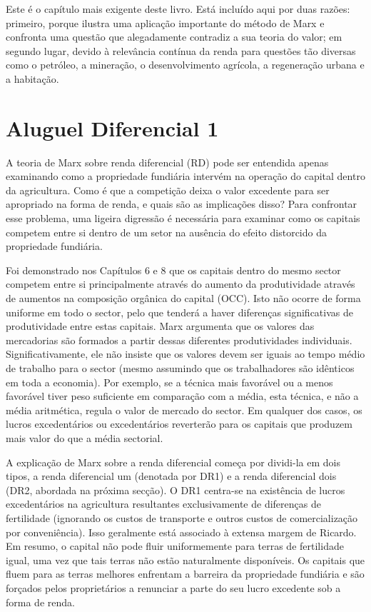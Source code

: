 \par 
Este é o capítulo mais exigente deste livro. Está incluído aqui por duas razões: primeiro, porque ilustra uma aplicação importante do método de Marx e confronta uma questão que alegadamente contradiz a sua teoria do valor; em segundo lugar, devido à relevância contínua da renda para questões tão diversas como o petróleo, a mineração, o desenvolvimento agrícola, a regeneração urbana e a habitação.
 \par 
\section{Aluguel Diferencial 1}
 \par 
A teoria de Marx sobre renda diferencial (RD) pode ser entendida apenas examinando como a propriedade fundiária intervém na operação do capital dentro da agricultura. Como é que a competição deixa o valor excedente para ser apropriado na forma de renda, e quais são as implicações disso? Para confrontar esse problema, uma ligeira digressão é necessária para examinar como os capitais competem entre si dentro de um setor na ausência do efeito distorcido da propriedade fundiária.
 \par 
Foi demonstrado nos Capítulos {\color{blue}6} e {\color{blue}8} que os capitais dentro do mesmo sector competem entre si principalmente através do aumento da produtividade através de aumentos na composição orgânica do capital (OCC). Isto não ocorre de forma uniforme em todo o sector, pelo que tenderá a haver diferenças significativas de produtividade entre estas capitais. Marx argumenta que os valores das mercadorias são formados a partir dessas diferentes produtividades individuais. Significativamente, ele não insiste que os valores devem ser iguais ao tempo médio de trabalho para o sector (mesmo assumindo que os trabalhadores são idênticos em toda a economia). Por exemplo, se a técnica mais favorável ou a menos favorável tiver peso suficiente em comparação com a média, esta técnica, e não a média aritmética, regula o valor de mercado do sector. Em qualquer dos casos, os lucros excedentários ou excedentários reverterão para os capitais que produzem mais valor do que a média sectorial.
 \par 
A explicação de Marx sobre a renda diferencial começa por dividi-la em dois tipos, a renda diferencial um (denotada por DR1) e a renda diferencial dois (DR2, abordada na próxima secção). O DR1 centra-se na existência de lucros excedentários na agricultura resultantes exclusivamente de diferenças de fertilidade (ignorando os custos de transporte e outros custos de comercialização por conveniência). Isso geralmente está associado à extensa margem de Ricardo. Em resumo, o capital não pode fluir uniformemente para terras de fertilidade igual, uma vez que tais terras não estão naturalmente disponíveis. Os capitais que fluem para as terras melhores enfrentam a barreira da propriedade fundiária e são forçados pelos proprietários a renunciar a parte do seu lucro excedente sob a forma de renda.

